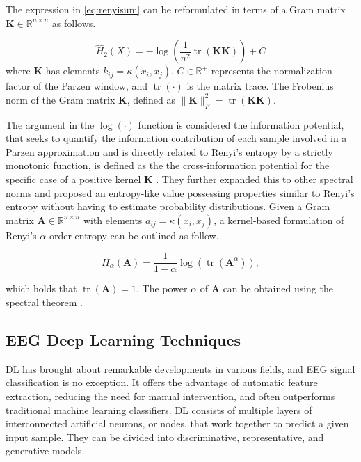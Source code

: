 The expression in \cref{eq:renyisum} can be reformulated in terms of a Gram matrix $\mathbf{K} \in \mathbb{R}^{n \times n}$ as follows.

\begin{equation}
    \hat{H}_{2}(X)=-\log \left(\frac{1}{n^{2}} \operatorname{tr}(\mathbf{K K})\right)+C    
\end{equation}
where $\mathbf{K}$ has elements $k_{i j}=\kappa\left(x_{i}, x_{j}\right)$. $C \in \mathbb{R}^{+}$ represents the normalization factor of the Parzen window, and $\operatorname{tr}(\cdot)$ is the matrix trace. The Frobenius norm of the Gram matrix $\mathbf{K}$, defined as $\|\mathbf{K}\|_{F}^{2}=\operatorname{tr}(\mathbf{K K})$.

The argument in the $\log(\cdot)$ function is considered the information potential, that seeks to quantify the information contribution of each sample involved in a Parzen approximation and is directly related to Renyi's entropy by a strictly monotonic function,  is defined as the the cross-information potential for the specific case of a positive kernel $\mathbf{K}$ \cite{giraldo2014measures}. They further expanded this to other spectral norms and proposed an entropy-like value possessing properties similar to Renyi's entropy without having to estimate probability distributions. Given a Gram matrix $\mathbf{A} \in \mathbb{R}^{n \times n}$ with elements $a_{i j}=\kappa\left(x_{i}, x_{j}\right)$, a kernel-based formulation of Renyi's $\alpha$-order entropy can be outlined as follow.

\begin{equation}
    H_{\alpha}(\mathbf{A})=\frac{1}{1-\alpha} \log \left(\operatorname{tr}\left(\mathbf{A}^{\alpha}\right)\right),    
\end{equation}

which holds that $\operatorname{tr}(\mathbf{A})=1$. The power $\alpha$ of $\mathbf{A}$ can be obtained using the spectral theorem \cite{giraldo2014measures}.

\subsection{EEG Deep Learning Techniques}

DL has brought about remarkable developments in various fields, and EEG signal classification is no exception. It offers the advantage of automatic feature extraction, reducing the need for manual intervention, and often outperforms traditional machine learning classifiers. DL consists of multiple layers of interconnected artificial neurons, or nodes, that work together to predict a given input sample. They can be divided into discriminative, representative, and generative models.

